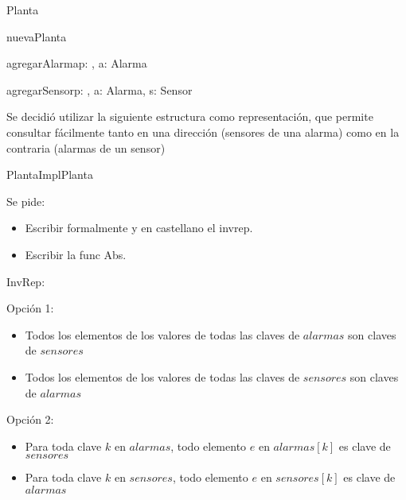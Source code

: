 \begin{tad}{Planta}{}

	\begin{proc}{nuevaPlanta}{}{\tadtype}
	\end{proc}

	\begin{proc}{agregarAlarma}{\Inout p: \tadtype, \In a: Alarma}{}
	\end{proc}

	\begin{proc}{agregarSensor}{\Inout p: \tadtype, \In a: Alarma, \In s: Sensor}{}
	\end{proc}
\end{tad}

Se decidió utilizar la siguiente estructura como representación, que permite consultar fácilmente tanto en una dirección (sensores de una alarma) como en la contraria (alarmas de un sensor)
\bigskip

\begin{module}{PlantaImpl}{}{Planta}{}
\end{module}

Se pide:
\begin{itemize}
	\item Escribir formalmente y en castellano el invrep.
	\item Escribir la func Abs.
\end{itemize}

InvRep:

Opción 1:
\begin{itemize}
	\item Todos los elementos de los valores de todas las claves de $alarmas$ son claves de $sensores$
	\item Todos los elementos de los valores de todas las claves de $sensores$ son claves de $alarmas$
\end{itemize}
Opción 2:
\begin{itemize}
	\item Para toda clave $k$ en $alarmas$, todo elemento $e$ en $alarmas[k]$ es clave de $sensores$
	\item Para toda clave $k$ en $sensores$, todo elemento $e$ en $sensores[k]$ es clave de $alarmas$
\end{itemize}

